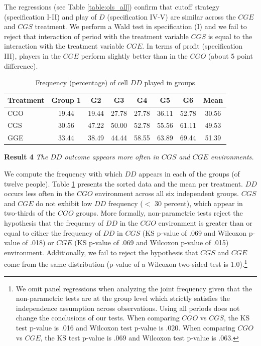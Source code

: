 \documentclass[11pt, letterpaper]{article}
\theoremstyle{plain}
\begin{document}
The regressions (see Table \ref{table:ols_all}) confirm that cutoff strategy (specification I-II) and play of $D$ (specification IV-V) are similar across the $CGE$ and $CGS$ treatment. We perform a Wald test in specification (I) and we fail to reject that interaction of period with the treatment variable $CGS$ is equal to the interaction with  the treatment variable $CGE$. In terms of profit (specification III), players in the $CGE$ perform slightly better than in the $CGO$ (about 5 point difference).\\

\begin{table}[!t]
\centering
\caption{Frequency (percentage) of cell $DD$ played in groups }
\begin{tabular}{lccccccc}
\hline
Treatment & Group 1 & G2  & G3 & G4 & G5 & G6 & Mean\\
  \hline
  CGO &  19.44 & 19.44&  27.78 & 27.78 & 36.11 & 52.78 & 30.56 \\
  CGS & 30.56 & 47.22&  50.00 & 52.78 & 55.56 & 61.11 & 49.53\\
  GGE & 33.44 & 38.49 & 44.44 & 58.55 & 63.89 & 69.44 & 51.39 \\
  \hline

\end{tabular}

\label{table:dd}
\end{table}

\noindent \textbf{Result 4}
\textit{The $DD$ outcome appears more often in $CGS$ and $CGE$ environments.}

We compute the frequency with which $DD$ appears in each of the groups (of twelve people). Table \ref{table:dd} presents the sorted data and the mean per treatment. $DD$ occurs less often in the $CGO$ environment across all six independent groups. $CGS$ and $CGE$ do not exhibit low $DD$ frequency ($<$ 30 percent), which appear in two-thirds of the $CGO$ groups. More formally, non-parametric tests reject the hypothesis that the frequency of $DD$ in the $CGO$ environment is greater than or equal to either the frequency of $DD$ in $CGS$ (KS p-value of .069 and Wilcoxon p-value of .018) or $CGE$ (KS p-value of .069 and Wilcoxon p-value of .015) environment. Additionally, we fail to reject the hypothesis that $CGS$ and $CGE$ come from the same distribution (p-value of a Wilcoxon two-sided test is 1.0).\footnote{We omit panel regressions when analyzing the joint frequency given that the non-parametric tests are at the group level which strictly satisfies the independence assumption across observations. Using all periods does not change the conclusions of our tests. When comparing $CGO$ vs $CGS$, the KS test p-value is .016 and Wilcoxon test p-value is .020. When comparing $CGO$ vs $CGE$, the KS test p-value is .069 and Wilcoxon test p-value is .063. }\\
\end{document}
